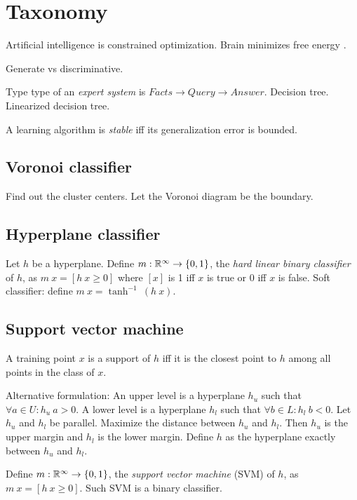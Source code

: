 \chapter{Taxonomy}

Artificial intelligence is constrained optimization.
Brain minimizes free energy \cite{friston2006free,friston2010free}.

Generate vs discriminative.

Type type of an \emph{expert system} is \(Facts \to Query \to Answer\).
Decision tree.
Linearized decision tree.

A learning algorithm is \emph{stable} iff its generalization error is bounded.

\section{Voronoi classifier}

Find out the cluster centers.
Let the Voronoi diagram be the boundary.

\section{Hyperplane classifier}

Let \(h\) be a hyperplane.
Define \(m : \mathbb{R}^\infty \to \{0,1\}\),
the \emph{hard linear binary classifier} of \(h\),
as \(m~x = [h~x \ge 0]\)
where \([x]\) is 1 iff \(x\) is true or 0 iff \(x\) is false.
Soft classifier: define \(m~x = \tanh^{-1}~(h~x)\).

\section{Support vector machine}

A training point \(x\) is a support of \(h\) iff
it is the closest point to \(h\)
among all points in the class of \(x\).

Alternative formulation:
An upper level is a hyperplane \(h_u\) such that \(\forall a \in U : h_u~a > 0\).
A lower level is a hyperplane \(h_l\) such that \(\forall b \in L : h_l~b < 0\).
Let \(h_u\) and \(h_l\) be parallel.
Maximize the distance between \(h_u\) and \(h_l\).
Then \(h_u\) is the upper margin and \(h_l\) is the lower margin.
Define \(h\) as the hyperplane exactly between \(h_u\) and \(h_l\).

Define \(m : \mathbb{R}^\infty \to \{0,1\}\),
the \emph{support vector machine} (SVM) of \(h\),
as \(m~x = [h~x \ge 0]\).
Such SVM is a binary classifier.

